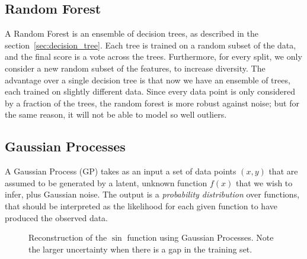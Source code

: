 \subsection{Random Forest}\label{sec:random_forest}
A Random Forest is an ensemble of decision trees, as described in the section~\ref{sec:decision_tree}.
Each tree is trained on a random subset of the data, and the final score is a vote across the trees.
Furthermore, for every split, we only consider a new random subset of the features, to increase diversity.
The advantage over a single decision tree is that now we have an ensemble of trees, each trained on slightly different data.
Since every data point is only considered by a fraction of the trees, the random forest is more robust against noise; but for the same reason, it will not be able to model so well outliers.


\subsection{Gaussian Processes}
A Gaussian Process (GP) takes as an input a set of data points $(x, y)$ that are assumed to be generated by a latent, unknown function $f(x)$ that we wish to infer, plus Gaussian noise. The output is a \emph{probability distribution} over functions, that should be interpreted as the likelihood for each given function to have produced the observed data.


\begin{figure}[htb]
	\centering
	\hfill
	\caption{Reconstruction of the $\sin$ function using Gaussian Processes.
	Note the larger uncertainty when there is a gap in the training set.}\label{fig:gp_toy}
\end{figure}


